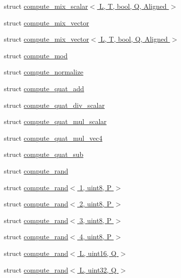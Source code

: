 \begin{DoxyCompactItemize}
\item 
struct \hyperlink{structglm_1_1detail_1_1compute__mix__scalar_3_01_l_00_01_t_00_01bool_00_01_q_00_01_aligned_01_4}{compute\+\_\+mix\+\_\+scalar$<$ L, T, bool, Q, Aligned $>$}
\item 
struct \hyperlink{structglm_1_1detail_1_1compute__mix__vector}{compute\+\_\+mix\+\_\+vector}
\item 
struct \hyperlink{structglm_1_1detail_1_1compute__mix__vector_3_01_l_00_01_t_00_01bool_00_01_q_00_01_aligned_01_4}{compute\+\_\+mix\+\_\+vector$<$ L, T, bool, Q, Aligned $>$}
\item 
struct \hyperlink{structglm_1_1detail_1_1compute__mod}{compute\+\_\+mod}
\item 
struct \hyperlink{structglm_1_1detail_1_1compute__normalize}{compute\+\_\+normalize}
\item 
struct \hyperlink{structglm_1_1detail_1_1compute__quat__add}{compute\+\_\+quat\+\_\+add}
\item 
struct \hyperlink{structglm_1_1detail_1_1compute__quat__div__scalar}{compute\+\_\+quat\+\_\+div\+\_\+scalar}
\item 
struct \hyperlink{structglm_1_1detail_1_1compute__quat__mul__scalar}{compute\+\_\+quat\+\_\+mul\+\_\+scalar}
\item 
struct \hyperlink{structglm_1_1detail_1_1compute__quat__mul__vec4}{compute\+\_\+quat\+\_\+mul\+\_\+vec4}
\item 
struct \hyperlink{structglm_1_1detail_1_1compute__quat__sub}{compute\+\_\+quat\+\_\+sub}
\item 
struct \hyperlink{structglm_1_1detail_1_1compute__rand}{compute\+\_\+rand}
\item 
struct \hyperlink{structglm_1_1detail_1_1compute__rand_3_011_00_01uint8_00_01_p_01_4}{compute\+\_\+rand$<$ 1, uint8, P $>$}
\item 
struct \hyperlink{structglm_1_1detail_1_1compute__rand_3_012_00_01uint8_00_01_p_01_4}{compute\+\_\+rand$<$ 2, uint8, P $>$}
\item 
struct \hyperlink{structglm_1_1detail_1_1compute__rand_3_013_00_01uint8_00_01_p_01_4}{compute\+\_\+rand$<$ 3, uint8, P $>$}
\item 
struct \hyperlink{structglm_1_1detail_1_1compute__rand_3_014_00_01uint8_00_01_p_01_4}{compute\+\_\+rand$<$ 4, uint8, P $>$}
\item 
struct \hyperlink{structglm_1_1detail_1_1compute__rand_3_01_l_00_01uint16_00_01_q_01_4}{compute\+\_\+rand$<$ L, uint16, Q $>$}
\item 
struct \hyperlink{structglm_1_1detail_1_1compute__rand_3_01_l_00_01uint32_00_01_q_01_4}{compute\+\_\+rand$<$ L, uint32, Q $>$}

\end{DoxyCompactItemize}
